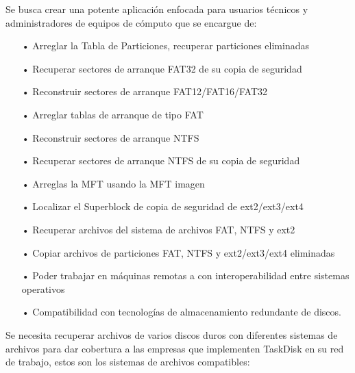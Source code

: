 \documentclass[10pt,a4paper]{article}
\begin{document}
Se busca crear una potente aplicación enfocada para usuarios técnicos y administradores de equipos de cómputo que se encargue de:
\begin{itemize}
\item[•]Arreglar la Tabla de Particiones, recuperar particiones eliminadas
\item[•]Recuperar sectores de arranque FAT32 de su copia de seguridad
\item[•]Reconstruir sectores de arranque FAT12/FAT16/FAT32
\item[•]Arreglar tablas de arranque de tipo FAT
\item[•]Reconstruir sectores de arranque NTFS
\item[•]Recuperar sectores de arranque NTFS de su copia de seguridad
\item[•]Arreglas la MFT usando la MFT imagen
\item[•]Localizar el Superblock de copia de seguridad de ext2/ext3/ext4
\item[•]Recuperar archivos del sistema de archivos FAT, NTFS y ext2
\item[•]Copiar archivos de particiones FAT, NTFS y ext2/ext3/ext4 eliminadas
\item[•]Poder trabajar en máquinas remotas a con interoperabilidad entre sistemas operativos 
\item[•]Compatibilidad con tecnologías de almacenamiento redundante de discos.
\end{itemize}
Se necesita recuperar archivos de varios discos duros con diferentes sistemas de archivos para dar cobertura a las empresas que implementen TaskDisk en su red de trabajo, estos son los sistemas de archivos compatibles:
\end{document}
